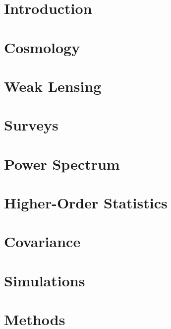 \documentclass[11pt,a4paper]{ipmu}
\begin{document}
\makethesistitle

%     

\tableofcontents  %
\listoffigures    %
\listoftables     %

\chapter{Introduction}


\chapter{Cosmology}


\chapter{Weak Lensing}


\chapter{Surveys}


\chapter{Power Spectrum}


\chapter{Higher-Order Statistics}





\chapter{Covariance}




\chapter{Simulations}


\chapter{Methods}

\end{document}
